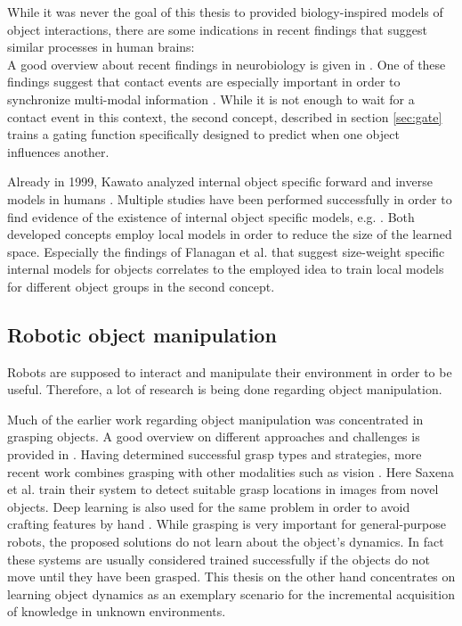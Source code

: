 While it was never the goal of this thesis to provided biology-inspired models of object interactions, there are some indications in recent findings that suggest similar processes in human brains: \\
A good overview about recent findings in neurobiology is given in \cite{flanagan2006control}. One of these findings suggest that contact events are especially important in order to synchronize multi-modal information \cite{johansson2001eye}. 
While it is not enough to wait for a contact event in this context, the second concept, described in section \ref{sec:gate} trains a gating function specifically designed to predict when one object influences another.

Already in 1999, Kawato analyzed internal object specific forward and inverse models in humans \cite{kawato1999internal}. Multiple studies have been performed successfully in order to find evidence of the existence of internal object specific models, e.g. \cite{flanagan2001sensorimotor, merfeld1999humans}.
Both developed concepts employ local models in order to reduce the size of the learned space. Especially the findings of Flanagan et al. \cite{flanagan2001sensorimotor} that suggest size-weight specific internal models for objects correlates to the employed idea to train local models for different object groups in the second concept.

\subsection{Robotic object manipulation}

Robots are supposed to interact and manipulate their environment in order to be useful. Therefore, a lot of research is being done regarding object manipulation.

Much of the earlier work regarding object manipulation was concentrated in grasping objects. A good overview on different approaches and challenges is provided in \cite{graspingReview}. Having determined successful grasp types and strategies, more recent work combines grasping with other modalities such as vision \cite{graspingVision}. Here Saxena et al. train their system to detect suitable grasp locations in images from novel objects.
Deep learning is also used for the same problem in order to avoid crafting features by hand \cite{graspingDeep}. 
While grasping is very important for general-purpose robots, the proposed solutions do not learn about the object's dynamics. In fact these systems are usually considered trained successfully if the objects do not move until they have been grasped. 
This thesis on the other hand concentrates on learning object dynamics as an exemplary scenario for the incremental acquisition of knowledge in unknown environments.

